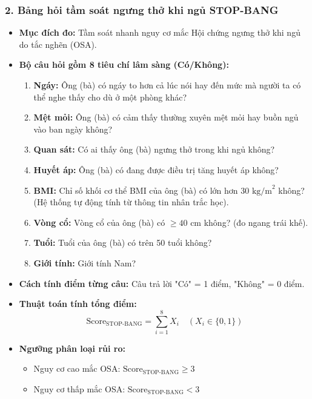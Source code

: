 \documentclass[12pt,a4paper]{article}
\begin{document}
\subsubsection*{2. Bảng hỏi tầm soát ngưng thở khi ngủ STOP-BANG}
\begin{itemize}
    \item \textbf{Mục đích đo:} Tầm soát nhanh nguy cơ mắc Hội chứng ngưng thở khi ngủ do tắc nghẽn (OSA).
    \item \textbf{Bộ câu hỏi gồm 8 tiêu chí lâm sàng (Có/Không):}
    \begin{enumerate}
        \item \textbf{Ngáy:} Ông (bà) có ngáy to hơn cả lúc nói hay đến mức mà người ta có thể nghe thấy cho dù ở một phòng khác?
        \item \textbf{Mệt mỏi:} Ông (bà) có cảm thấy thường xuyên mệt mỏi hay buồn ngủ vào ban ngày không?
        \item \textbf{Quan sát:} Có ai thấy ông (bà) ngưng thở trong khi ngủ không?
        \item \textbf{Huyết áp:} Ông (bà) có đang được điều trị tăng huyết áp không?
        \item \textbf{BMI:} Chỉ số khối cơ thể BMI của ông (bà) có lớn hơn $30\text{ kg/m}^2$ không? (Hệ thống tự động tính từ thông tin nhân trắc học).
        \item \textbf{Vòng cổ:} Vòng cổ của ông (bà) có $\ge 40\text{ cm}$ không? (đo ngang trái khế).
        \item \textbf{Tuổi:} Tuổi của ông (bà) có trên 50 tuổi không?
        \item \textbf{Giới tính:} Giới tính Nam?
    \end{enumerate}
    \item \textbf{Cách tính điểm từng câu:} Câu trả lời "Có" = 1 điểm, "Không" = 0 điểm.
    \item \textbf{Thuật toán tính tổng điểm:}
    \begin{equation}
        \text{Score}_{\text{STOP-BANG}} = \sum_{i=1}^{8} X_i \quad (X_i \in \{0, 1\})
    \end{equation}
    \item \textbf{Ngưỡng phân loại rủi ro:}
    \begin{itemize}
        \item Nguy cơ cao mắc OSA: $\text{Score}_{\text{STOP-BANG}} \ge 3$
        \item Nguy cơ thấp mắc OSA: $\text{Score}_{\text{STOP-BANG}} < 3$
    \end{itemize}
\end{itemize}
\end{document}

